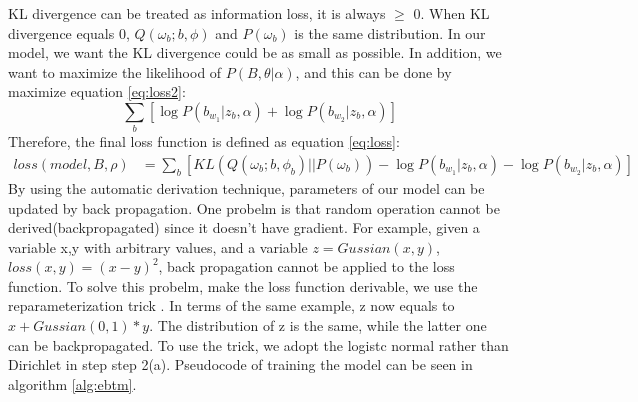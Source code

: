 KL divergence can be treated as information loss, it is always $\geq$ 0. When KL divergence equals 0, $Q(\omega_b;b,\phi)$ and $P(\omega_b)$ is the same distribution. In our model, we want the KL divergence could be as small as possible. In addition, we want to maximize the likelihood of $P(B,\theta|\alpha)$, and this can be done by maximize equation \ref{eq:loss2}:
\begin{equation}
    \sum_b\left[\log P(b_{w_1}|z_b,\alpha)+\log P(b_{w_2}|z_b,\alpha)\right]
    \label{eq:loss2}
\end{equation}
Therefore, the final loss function is defined as equation \ref{eq:loss}:
\begin{equation}
    \begin{aligned}
        loss(model, B, \rho) & = \sum_b\left[KL(Q(\omega_b;b,\phi_b)||P(\omega_b))-\log P(b_{w_1}|z_b,\alpha)-\log P(b_{w_2}|z_b,\alpha)\right] 
    \end{aligned}    
    \label{eq:loss}
\end{equation}
By using the automatic derivation technique, parameters of our model can be updated by back propagation. One probelm is that random operation cannot be derived(backpropagated) since it doesn't have gradient. For example, given a variable x,y with arbitrary values, and a variable $z = Gussian(x,y)$, $loss(x,y) = (x-y)^2$, back propagation cannot be applied to the loss function. To solve this probelm, make the loss function derivable, we use the reparameterization trick \cite{kingma2013auto}. In terms of the same example, z now equals to $x + Gussian(0,1) * y$. The distribution of z is the same, while the latter one can be backpropagated. To use the trick, we adopt the logistc normal rather than Dirichlet in step step 2(a). Pseudocode of training the model can be seen in algorithm \ref{alg:ebtm}.
